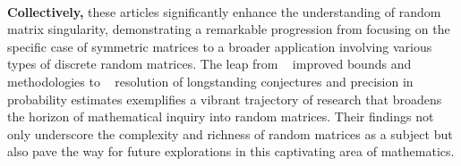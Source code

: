 \\\newline\textbf{Collectively,} these articles significantly enhance the understanding of random matrix singularity, demonstrating a remarkable progression from focusing on the specific case of symmetric matrices to a broader application involving various types of discrete random matrices.
The leap from ~\cite{campos2020singularity} improved bounds and methodologies to ~\cite{jain2021singularity} resolution of longstanding conjectures and precision in probability estimates exemplifies a vibrant trajectory of research that broadens the horizon of mathematical inquiry into random matrices. 
Their findings not only underscore the complexity and richness of random matrices as a subject but also pave the way for future explorations in this captivating area of mathematics.